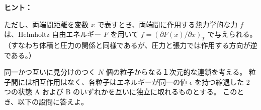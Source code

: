 \documentclass[uplatex,dvipdfmx,a4paper,11pt]{jsarticle}
\begin{document}
\begin{enumerate}
\begin{itembox}[l]{{\bf ヒント：}}

ただし、両端間距離を変数 $x$ で表すとき、両端間に作用する熱力学的な力 $f$ は、Helmholtz 自由エネルギー $F$ を用いて $f = (\partial F(x)/\partial x)_T$ で与えられる。
（すなわち体積と圧力の関係と同様であるが、圧力と張力では作用する方向が逆である。）

\end{itembox}

\color{black}

\end{enumerate}

\newpage


同一かつ互いに見分けのつく $N$ 個の粒子からなる１次元的な連鎖を考える。
粒子間には相互作用はなく、各粒子はエネルギーが同一の値 $\epsilon$ を持つ縮退した 2 つの状態 A および B のいずれかを互いに独立に取れるものとする。
このとき、以下の設問に答えよ。
\end{document}
